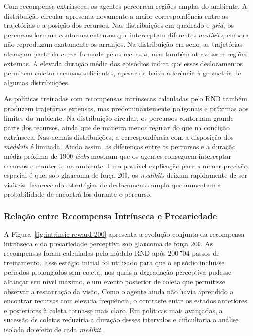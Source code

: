 Com recompensa extrínseca, os agentes percorrem regiões amplas do ambiente. A distribuição circular apresenta novamente a maior correspondência entre as trajetórias e a posição dos recursos. Nas distribuições em quadrado e \textit{grid}, os percursos formam contornos extensos que interceptam diferentes \textit{medikits}, embora não reproduzam exatamente os arranjos. Na distribuição em seno, as trajetórias alcançam parte da curva formada pelos recursos, mas também atravessam regiões externas. A elevada duração média dos episódios indica que esses deslocamentos permitem coletar recursos suficientes, apesar da baixa aderência à geometria de algumas distribuições.

As políticas treinadas com recompensas intrínsecas calculadas pelo RND também produzem trajetórias extensas, mas predominantemente poligonais e próximas aos limites do ambiente. Na distribuição circular, os percursos contornam grande parte dos recursos, ainda que de maneira menos regular do que na condição extrínseca. Nas demais distribuições, a correspondência com a disposição dos \textit{medikits} é limitada. Ainda assim, as diferenças entre os percursos e a duração média próxima de $1900$ \textit{ticks} mostram que os agentes conseguem interceptar recursos e manter-se no ambiente. Uma possível explicação para a menor precisão espacial é que, sob glaucoma de força $200$, os \textit{medikits} deixam rapidamente de ser visíveis, favorecendo estratégias de deslocamento amplo que aumentam a probabilidade de encontrá-los durante o percurso.

\subsubsection{Relação entre Recompensa Intrínseca e Precariedade}

A Figura~\ref{fig:intrinsic-reward-200} apresenta a evolução conjunta da recompensa intrínseca e da precariedade perceptiva sob glaucoma de força $200$. As recompensas foram calculadas pelo módulo RND após $200\,704$ passos de treinamento. Esse estágio inicial foi utilizado para que o episódio incluísse períodos prolongados sem coleta, nos quais a degradação perceptiva pudesse alcançar seu nível máximo, e um evento posterior de coleta que permitisse observar a restauração da visão. Como o agente ainda não havia aprendido a encontrar recursos com elevada frequência, o contraste entre os estados anteriores e posteriores à coleta torna-se mais claro. Em políticas mais avançadas, a sucessão de coletas reduziria a duração desses intervalos e dificultaria a análise isolada do efeito de cada \textit{medikit}.

